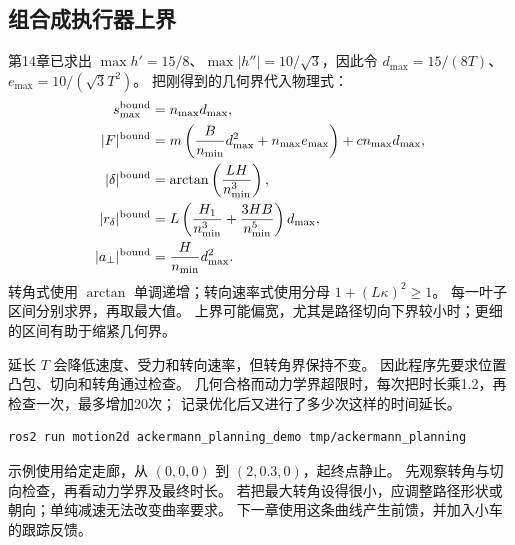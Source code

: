 \subsection{组合成执行器上界}
第14章已求出 $\max h'=15/8$、$\max|h''|=10/\sqrt3$，因此令
$d_{\max}=15/(8T)$、$e_{\max}=10/(\sqrt3T^2)$。
把刚得到的几何界代入物理式：
\begin{align}
 s_{\max}^{\rm bound}&=n_{\max}d_{\max},\\
 |F|^{\rm bound}&=m\left(\frac B{n_{\min}}d_{\max}^2+n_{\max}e_{\max}\right)
                  +cn_{\max}d_{\max},\\
 |\delta|^{\rm bound}&=\arctan\left(\frac{LH}{n_{\min}^3}\right),\\
 |r_\delta|^{\rm bound}&=L\left(\frac{H_1}{n_{\min}^3}+\frac{3HB}{n_{\min}^5}\right)d_{\max},\\
 |a_\perp|^{\rm bound}&=\frac H{n_{\min}}d_{\max}^2.
\end{align}
转角式使用 $\arctan$ 单调递增；转向速率式使用分母 $1+(L\kappa)^2\ge1$。
每一叶子区间分别求界，再取最大值。
上界可能偏宽，尤其是路径切向下界较小时；更细的区间有助于缩紧几何界。

延长 $T$ 会降低速度、受力和转向速率，但转角界保持不变。
因此程序先要求位置凸包、切向和转角通过检查。
几何合格而动力学界超限时，每次把时长乘1.2，再检查一次，最多增加20次；
 记录优化后又进行了多少次这样的时间延长。

\begin{lstlisting}[language=bash,numbers=none]
ros2 run motion2d ackermann_planning_demo tmp/ackermann_planning
\end{lstlisting}
示例使用给定走廊，从 $(0,0,0)$ 到 $(2,0.3,0)$，起终点静止。
先观察转角与切向检查，再看动力学界及最终时长。
若把最大转角设得很小，应调整路径形状或朝向；单纯减速无法改变曲率要求。
下一章使用这条曲线产生前馈，并加入小车的跟踪反馈。


